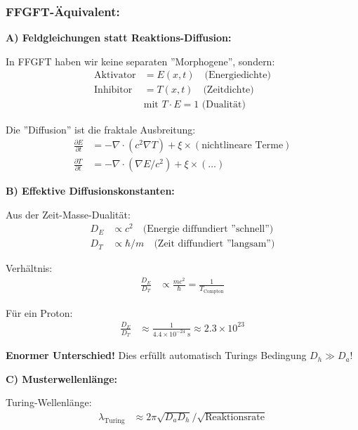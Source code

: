 \subsubsection*{FFGFT-Äquivalent:}

\textbf{A) Feldgleichungen statt Reaktions-Diffusion:}

In FFGFT haben wir keine separaten ''Morphogene'', sondern:
\begin{align*}
	\text{Aktivator} &= E(x,t) \quad \text{(Energiedichte)} \\
	\text{Inhibitor} &= T(x,t) \quad \text{(Zeitdichte)} \\
	&\text{mit } T \cdot E = 1 \text{ (Dualität)}
\end{align*}

Die ''Diffusion'' ist die fraktale Ausbreitung:
\begin{align*}
	\frac{\partial E}{\partial t} &= -\nabla \cdot (c^2 \nabla T) + \xi \times (\text{nichtlineare Terme}) \\
	\frac{\partial T}{\partial t} &= -\nabla \cdot (\nabla E/c^2) + \xi \times (\dots)
\end{align*}

\textbf{B) Effektive Diffusionskonstanten:}

Aus der Zeit-Masse-Dualität:
\begin{align*}
	D_E &\propto c^2 \quad \text{(Energie diffundiert ''schnell'')} \\
	D_T &\propto \hbar/m \quad \text{(Zeit diffundiert ''langsam'')}
\end{align*}

Verhältnis:
\begin{align*}
	\frac{D_E}{D_T} &\propto \frac{m c^2}{\hbar} = \frac{1}{T_{\text{Compton}}}
\end{align*}

Für ein Proton:
\begin{align*}
	\frac{D_E}{D_T} &\approx \frac{1}{4.4 \times 10^{-24} \text{ s}} \approx 2.3 \times 10^{23}
\end{align*}

\textbf{Enormer Unterschied!} Dies erfüllt automatisch Turings Bedingung $D_h \gg D_a$!

\textbf{C) Musterwellenlänge:}

Turing-Wellenlänge:
\begin{align*}
	\lambda_{\text{Turing}} &\approx 2\pi \sqrt{D_a D_h} / \sqrt{\text{Reaktionsrate}}
\end{align*}

